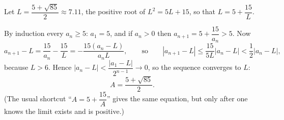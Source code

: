 Let $L=\dfrac{5+\sqrt{85}}2\approx7.11$, the positive root of $L^2=5L+15$, so that $L=5+\dfrac{15}L$.

By induction every $a_n\ge5$: $a_1=5$, and if $a_n>0$ then $a_{n+1}=5+\dfrac{15}{a_n}>5$. Now
\[a_{n+1}-L=\dfrac{15}{a_n}-\dfrac{15}L=-\dfrac{15\left(a_n-L\right)}{a_nL},\qquad\text{so}\qquad \left|a_{n+1}-L\right|\le\dfrac{15}{5L}\left|a_n-L\right|<\dfrac12\left|a_n-L\right|,\]
because $L>6$. Hence $\left|a_n-L\right|<\dfrac{\left|a_1-L\right|}{2^{n-1}}\to0$, so the sequence converges to $L$:
\[A=\boxed{\dfrac{5+\sqrt{85}}2}.\]
(The usual shortcut ``$A=5+\dfrac{15}A$'' gives the same equation, but only after one knows the limit exists and is positive.)
